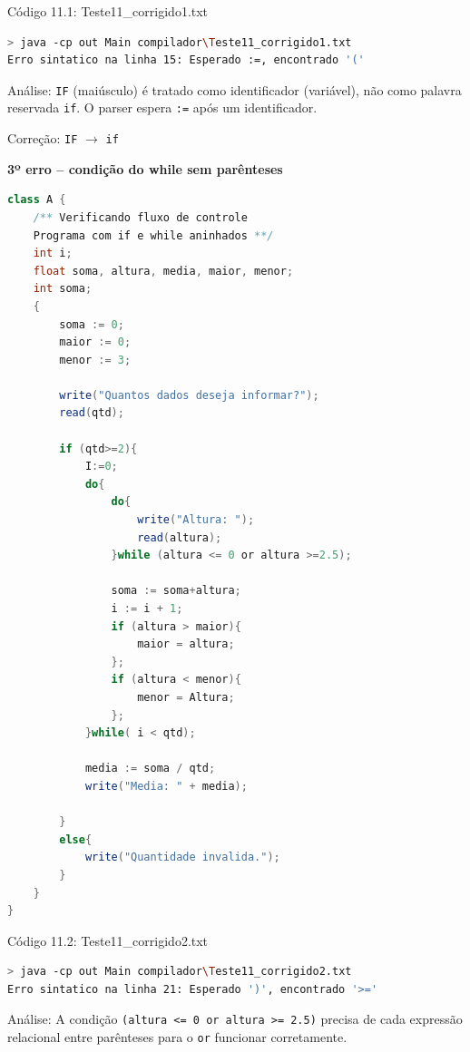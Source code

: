 \documentclass[12pt,a4paper]{article}
\begin{document}
Código 11.1: Teste11\_corrigido1.txt

\begin{lstlisting}[language=bash]
> java -cp out Main compilador\Teste11_corrigido1.txt
Erro sintatico na linha 15: Esperado :=, encontrado '('
\end{lstlisting}

Análise: \texttt{IF} (maiúsculo) é tratado como identificador (variável), não como palavra reservada \texttt{if}. O parser espera \texttt{:=} após um identificador.

Correção: \texttt{IF} $\to$ \texttt{if}

\textbf{3º erro -- condição do while sem parênteses}

\begin{lstlisting}[language=Java]
class A {
    /** Verificando fluxo de controle
    Programa com if e while aninhados **/
    int i;
    float soma, altura, media, maior, menor;
    int soma;
    {
        soma := 0;
        maior := 0;
        menor := 3;

        write("Quantos dados deseja informar?");
        read(qtd);

        if (qtd>=2){
            I:=0;
            do{
                do{
                    write("Altura: ");
                    read(altura);
                }while (altura <= 0 or altura >=2.5);

                soma := soma+altura;
                i := i + 1;
                if (altura > maior){
                    maior = altura;
                };
                if (altura < menor){
                    menor = Altura;
                };
            }while( i < qtd);

            media := soma / qtd;
            write("Media: " + media);

        }
        else{
            write("Quantidade invalida.");
        }
    }
}
\end{lstlisting}

Código 11.2: Teste11\_corrigido2.txt

\begin{lstlisting}[language=bash]
> java -cp out Main compilador\Teste11_corrigido2.txt
Erro sintatico na linha 21: Esperado ')', encontrado '>='
\end{lstlisting}

Análise: A condição \texttt{(altura <= 0 or altura >= 2.5)} precisa de cada expressão relacional entre parênteses para o \texttt{or} funcionar corretamente.
\end{document}
